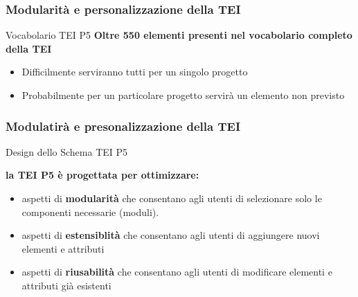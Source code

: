 
    \begin{frame}
        \frametitle{Modularità e personalizzazione della TEI}
        \addtocounter{nframe}{1}
        
    
        \begin{block}{Vocabolario TEI P5}
            \textbf{Oltre 550 elementi presenti nel vocabolario completo della TEI}
                \begin{itemize}
                    \item Difficilmente serviranno tutti per un singolo progetto
                    \item Probabilmente per un particolare progetto servirà un elemento
                    non previsto
                \end{itemize} 
            \end{block}
    \end{frame}

    \begin{frame}
        \frametitle{Modulatirà e presonalizzazione della TEI}
        \addtocounter{nframe}{1}
        
    
        \begin{block}{Design dello Schema TEI P5}
            
            \textbf{la TEI P5 è progettata per ottimizzare:}
                \begin{itemize}
                    \item aspetti di \textbf{modularità} che consentano agli utenti di selezionare solo le componenti necessarie (moduli).
                    \item aspetti di \textbf{estensiblità} che consentano agli utenti di aggiungere nuovi elementi e attributi
                    \item aspetti di \textbf{riusabilità} che consentano agli utenti di modificare elementi e attributi già esistenti
                \end{itemize} 
        \end{block}
        
    \end{frame}

